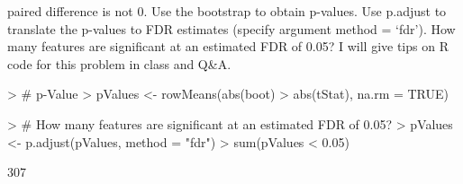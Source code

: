 \documentclass[12pt,a4paper]{paper}
\begin{document}
\begin{enumerate}
\begin{enumerate}
paired difference is not 0. Use the bootstrap to obtain p-values. Use p.adjust to translate
the p-values to FDR estimates (specify argument method = ‘fdr’). How many features
are significant at an estimated FDR of 0.05? I will give tips on R code for this problem
in class and Q\&A.
\begin{Schunk}
\end{Schunk}
\begin{Schunk}
\begin{Sinput}
> # p-Value
> pValues <- rowMeans(abs(boot) > abs(tStat), na.rm = TRUE)
\end{Sinput}
\end{Schunk}
\begin{Schunk}
\begin{Sinput}
> # How many features are significant at an estimated FDR of 0.05?
> pValues <- p.adjust(pValues, method = "fdr")
> sum(pValues < 0.05)
\end{Sinput}
\begin{Soutput}
[1] 307
\end{Soutput}
\end{Schunk}
\end{enumerate}
\end{enumerate}
\end{document}
